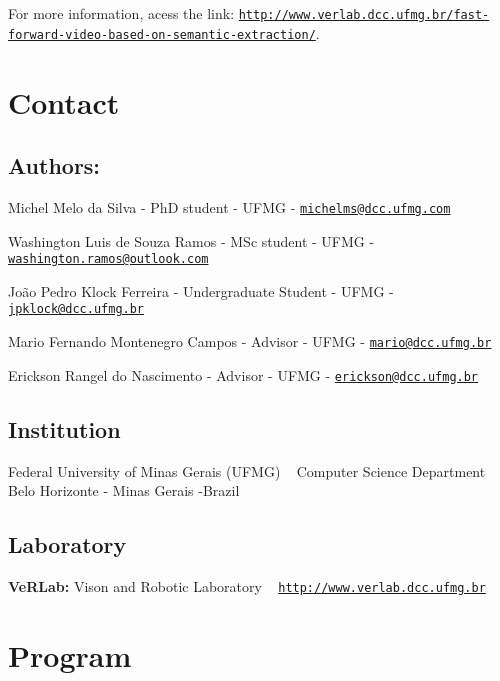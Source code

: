 For more information, acess the link\+: \href{http://www.verlab.dcc.ufmg.br/fast-forward-video-based-on-semantic-extraction/}{\tt http\+://www.\+verlab.\+dcc.\+ufmg.\+br/fast-\/forward-\/video-\/based-\/on-\/semantic-\/extraction/}. ~\newline
 \hypertarget{index_contact_sec}{}\section{Contact}\label{index_contact_sec}
\hypertarget{index_authors_sec}{}\subsection{Authors\+:}\label{index_authors_sec}
\begin{DoxyItemize}
\item Michel Melo da Silva -\/ PhD student -\/ U\+F\+MG -\/ \href{mailto:michelms@dcc.ufmg.com}{\tt michelms@dcc.\+ufmg.\+com} \item Washington Luis de Souza Ramos -\/ M\+Sc student -\/ U\+F\+MG -\/ \href{mailto:washington.ramos@outlook.com}{\tt washington.\+ramos@outlook.\+com} \item João Pedro Klock Ferreira -\/ Undergraduate Student -\/ U\+F\+MG -\/ \href{mailto:jpklock@dcc.ufmg.br}{\tt jpklock@dcc.\+ufmg.\+br} \item Mario Fernando Montenegro Campos -\/ Advisor -\/ U\+F\+MG -\/ \href{mailto:mario@dcc.ufmg.br}{\tt mario@dcc.\+ufmg.\+br} \item Erickson Rangel do Nascimento -\/ Advisor -\/ U\+F\+MG -\/ \href{mailto:erickson@dcc.ufmg.br}{\tt erickson@dcc.\+ufmg.\+br}\end{DoxyItemize}
\hypertarget{index_institution_sec}{}\subsection{Institution}\label{index_institution_sec}
Federal University of Minas Gerais (U\+F\+MG) ~\newline
Computer Science Department ~\newline
Belo Horizonte -\/ Minas Gerais -\/\+Brazil\hypertarget{index_laboratory_subsec}{}\subsection{Laboratory}\label{index_laboratory_subsec}
{\bfseries Ve\+R\+Lab\+:} Vison and Robotic Laboratory ~\newline
\href{http://www.verlab.dcc.ufmg.br}{\tt http\+://www.\+verlab.\+dcc.\+ufmg.\+br}\hypertarget{index_program_sec}{}\section{Program}\label{index_program_sec}
